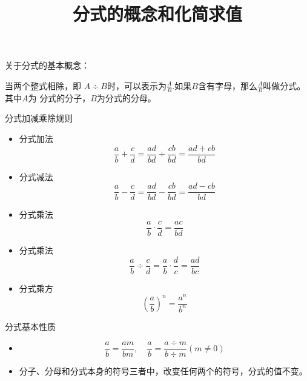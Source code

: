 \documentclass[windows,csize4]{BHCexam}
\title{分式的概念和化简求值}
\begin{document}
\maketitle

\begin{groups}


    关于分式的基本概念：\\
    \fbox
    {
        \parbox{\textwidth}
        {
            当两个整式相除，即 $A\div B$时，可以表示为$\frac{A}{B}$.如果$B$含有字母，那么$\frac{A}{B}$叫做分式。其中$A$为
            分式的分子，$B$为分式的分母。
        }
    }

    分式加减乘除规则
    \begin{itemize}
        \item 分式加法 \\
              \[
                  \frac{a}{b}+\frac{c}{d}=\frac{ad}{bd}+\frac{cb}{bd}=\frac{ad+cb}{bd}
              \]

        \item 分式减法 \\
              \[
                  \frac{a}{b}-\frac{c}{d}=\frac{ad}{bd}-\frac{cb}{bd}=\frac{ad-cb}{bd}
              \]
        \item 分式乘法 \\
              \[
                  \frac{a}{b}\cdot\frac{c}{d}=\frac{ac}{bd}
              \]
        \item 分式乘法 \\
              \[
                  \frac{a}{b}\div\frac{c}{d}=\frac{a}{b}\cdot\frac{d}{c}=\frac{ad}{bc}
              \]
        \item 分式乘方 \\
              \[
                  \left(\frac{a}{b}\right)^n=\frac{a^n}{b^n}
              \]
    \end{itemize}

    分式基本性质
    \begin{itemize}
        \item
              \[
                  \frac{a}{b}=\frac{am}{bm}, \quad
                  \frac{a}{b}=\frac{a\div m}{b\div m} (m\neq 0)
              \]
        \item 分子、分母和分式本身的符号三者中，改变任何两个的符号，分式的值不变。
    \end{itemize}


\end{groups}
\end{document}

